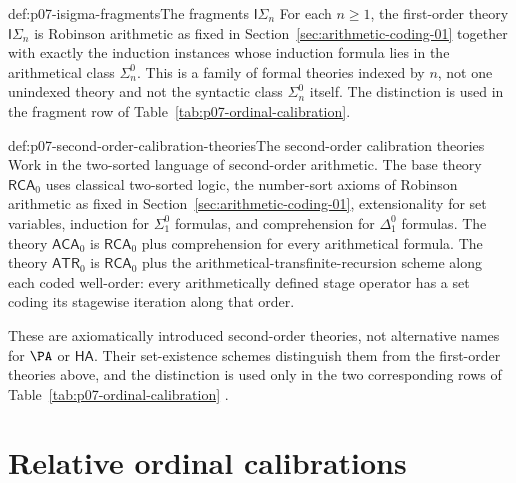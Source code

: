 \begin{hbdefinition}{def:p07-isigma-fragments}{The fragments \(\mathsf I\Sigma_n\)}
For each \(n\geq1\), the first-order theory \(\mathsf I\Sigma_n\) is
Robinson arithmetic as fixed in Section~\ref{sec:arithmetic-coding-01} together with
exactly the induction instances whose induction formula lies in the
arithmetical class \(\Sigma^0_n\).  This is a family of formal theories indexed
by \(n\), not one unindexed theory and not the syntactic class
\(\Sigma^0_n\) itself.  The distinction is used in the fragment row of
Table~\ref{tab:p07-ordinal-calibration}.
\end{hbdefinition}

\begin{hbdefinition}{def:p07-second-order-calibration-theories}{The second-order calibration theories}
Work in the two-sorted language of second-order arithmetic.  The base theory
\(\mathsf{RCA}_0\) uses classical two-sorted logic, the number-sort axioms of
Robinson arithmetic as fixed in Section~\ref{sec:arithmetic-coding-01}, extensionality
for set variables, induction for \(\Sigma^0_1\) formulas, and comprehension
for \(\Delta^0_1\) formulas.  The theory
\(\mathsf{ACA}_0\) is \(\mathsf{RCA}_0\) plus comprehension for every
arithmetical formula.  The theory \(\mathsf{ATR}_0\) is
\(\mathsf{RCA}_0\) plus the arithmetical-transfinite-recursion scheme along
each coded well-order: every arithmetically defined stage operator has a set
coding its stagewise iteration along that order.

These are axiomatically introduced second-order theories, not alternative
names for \(\PA\) or \(\mathsf{HA}\).  Their set-existence schemes distinguish
them from the first-order theories above, and the distinction is used only in
the two corresponding rows of Table~\ref{tab:p07-ordinal-calibration}
\cite{Simpson2009}.
\end{hbdefinition}

\section{Relative ordinal calibrations}
\label{sec:p07-ordinal-calibration}

